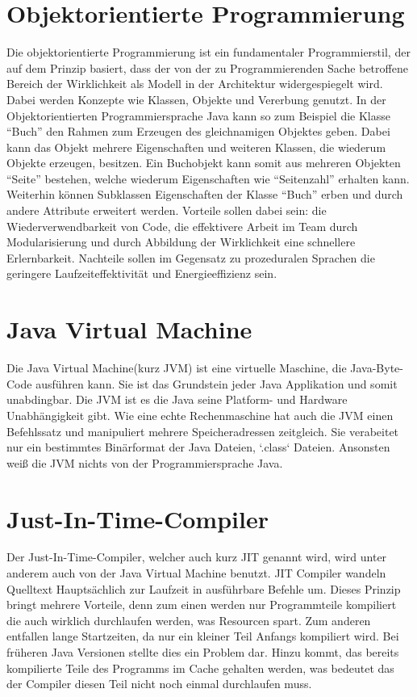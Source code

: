 \section{Objektorientierte Programmierung}
\label{sec:OO}
Die objektorientierte Programmierung ist ein fundamentaler Programmierstil, der
auf dem Prinzip basiert, dass der von der zu Programmierenden Sache betroffene
Bereich der Wirklichkeit als Modell in der Architektur widergespiegelt wird.
Dabei werden Konzepte wie Klassen, Objekte und Vererbung genutzt.
In der Objektorientierten Programmiersprache Java kann so zum Beispiel die
Klasse "`Buch"' den Rahmen zum Erzeugen des gleichnamigen Objektes geben. Dabei
kann das Objekt mehrere Eigenschaften und weiteren Klassen, die
wiederum Objekte erzeugen, besitzen. Ein Buchobjekt kann somit aus mehreren
Objekten "`Seite"' bestehen, welche wiederum Eigenschaften wie "`Seitenzahl"'
erhalten kann. Weiterhin können Subklassen Eigenschaften der Klasse "`Buch"'
erben und durch andere Attribute erweitert werden.
Vorteile sollen dabei sein: die Wiederverwendbarkeit von Code, die effektivere
Arbeit im Team durch Modularisierung und durch Abbildung der Wirklichkeit eine
schnellere Erlernbarkeit. Nachteile sollen im Gegensatz zu prozeduralen Sprachen
die geringere Laufzeiteffektivität und Energieeffizienz sein.

\section{Java Virtual Machine}
\label{sec:JVM}
Die Java Virtual Machine(kurz JVM) ist eine virtuelle Maschine, die
Java-Byte-Code ausführen kann. Sie ist das Grundstein jeder Java Applikation und somit
unabdingbar. Die JVM ist es die Java seine Platform- und Hardware Unabhängigkeit
gibt. Wie eine echte Rechenmaschine hat auch die JVM einen Befehlssatz und
manipuliert mehrere Speicheradressen zeitgleich. Sie verabeitet nur ein
bestimmtes Binärformat der Java Dateien, `.class` Dateien. Ansonsten weiß die
JVM nichts von der Programmiersprache Java.

\section{Just-In-Time-Compiler}
\label{sec:JIT}
Der Just-In-Time-Compiler, welcher auch kurz JIT genannt wird, wird unter
anderem auch von der Java Virtual Machine benutzt. JIT Compiler wandeln 
Quelltext Hauptsächlich zur Laufzeit in ausführbare Befehle um. Dieses Prinzip
bringt mehrere Vorteile, denn zum einen werden nur Programmteile kompiliert die
auch wirklich durchlaufen werden, was Resourcen spart. Zum anderen entfallen
lange Startzeiten, da nur ein kleiner Teil Anfangs kompiliert wird. Bei früheren
Java Versionen stellte dies ein Problem dar. Hinzu kommt, das bereits
kompilierte Teile des Programms im Cache gehalten werden, was bedeutet das der
Compiler diesen Teil nicht noch einmal durchlaufen muss.

